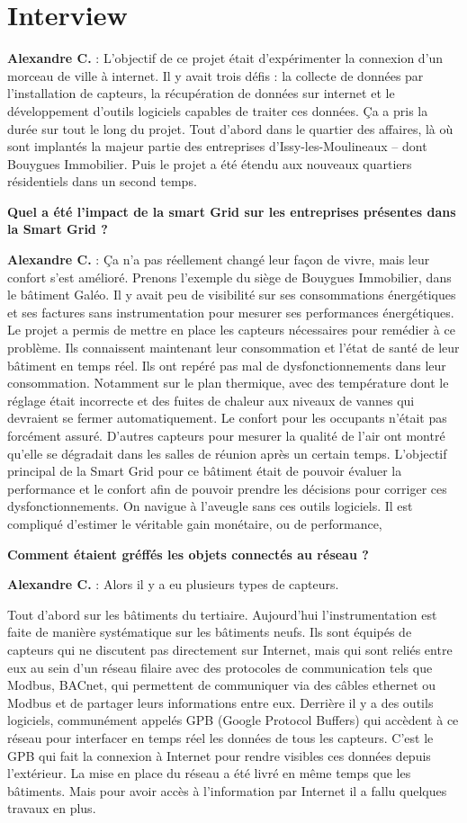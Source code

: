 \section*{Interview}
\textbf{Alexandre C.} :
L'objectif de ce projet était d’expérimenter la connexion d’un morceau de ville à internet.
Il y avait trois défis : la collecte de données par l’installation de capteurs,
la récupération de données sur internet et le développement d’outils logiciels capables de traiter ces données.
Ça a pris la durée sur tout le long du projet. Tout d’abord dans le quartier des affaires,
là où sont implantés la majeur partie des entreprises d'Issy-les-Moulineaux – dont Bouygues Immobilier.
Puis le projet a été étendu aux nouveaux quartiers résidentiels dans un second temps.

\textbf{Quel a été l’impact de la smart Grid sur les entreprises présentes dans la Smart Grid ?}

\textbf{Alexandre C.} :
Ça n’a pas réellement changé leur façon de vivre, mais leur confort s'est amélioré.
Prenons l'exemple du siège de Bouygues Immobilier, dans le bâtiment Galéo.
Il y avait peu de visibilité sur ses consommations énergétiques
et ses factures sans instrumentation pour mesurer ses performances énergétiques.
Le projet a permis de mettre en place les capteurs nécessaires pour remédier à ce problème.
Ils connaissent maintenant leur consommation et l’état de santé de leur bâtiment en temps réel.
Ils ont repéré pas mal de dysfonctionnements dans leur consommation.
Notamment sur le plan thermique, avec des température dont le réglage était incorrecte
et des fuites de chaleur aux niveaux de vannes qui devraient se fermer automatiquement.
Le confort pour les occupants n’était pas forcément assuré.
D'autres capteurs pour mesurer la qualité de l’air ont montré qu'elle se dégradait dans les salles de réunion après un certain temps.
L’objectif principal de la Smart Grid pour ce bâtiment était de pouvoir évaluer la performance
et le confort afin de pouvoir prendre les décisions pour corriger ces dysfonctionnements.
On navigue à l’aveugle sans ces outils logiciels.
Il est compliqué d’estimer le véritable gain monétaire, ou de performance,

\textbf{Comment étaient gréffés les objets connectés au réseau ?}

\textbf{Alexandre C.} :
Alors il y a eu plusieurs types de capteurs.

Tout d’abord sur les bâtiments du tertiaire.
Aujourd’hui l’instrumentation est faite de manière systématique sur les bâtiments neufs.
Ils sont équipés de capteurs qui ne discutent pas directement sur Internet,
mais qui sont reliés entre eux au sein d’un réseau filaire avec des protocoles de communication
tels que Modbus, BACnet, qui permettent de communiquer via des câbles ethernet ou Modbus
et de partager leurs informations entre eux.
Derrière il y a des outils logiciels, communément appelés GPB (Google Protocol Buffers) qui accèdent à ce réseau
pour interfacer en temps réel les données de tous les capteurs.
C'est le GPB qui fait la connexion à Internet pour rendre visibles ces données depuis l'extérieur.
La mise en place du réseau a été livré en même temps que les bâtiments.
Mais pour avoir accès à l’information par Internet il a fallu quelques travaux en plus.

